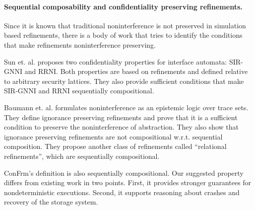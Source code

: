 \paragraph{Sequential composability and confidentiality preserving refinements.} 
Since it is known that traditional noninterference is not preserved in simulation based refinements, there is a body of work that tries to identify the conditions that make refinements noninterference preserving. 

Sun et. al. \cite{sun} proposes two confidentiality properties for interface automata: SIR-GNNI and RRNI. Both properties are based on refinements and defined relative to arbitrary security lattices. They also provide sufficient conditions that make SIR-GNNI and RRNI sequentially compositional. 

Baumann et. al. \cite{baumann} formulates noninterference as an epistemic logic over trace sets. They define ignorance preserving refinements and prove that it is a sufficient condition to preserve the noninterference of abstraction. They also show that ignorance preserving refinements are not compositional w.r.t. sequential composition. They propose another class of refinements called “relational refinements”, which are sequentially compositional. 

ConFrm’s definition is also sequentially compositional. Our suggested property differs from existing work in two points. First, it provides stronger guarantees for nondeterministic executions. Second, it supports reasoning about crashes and recovery of the storage system. 
